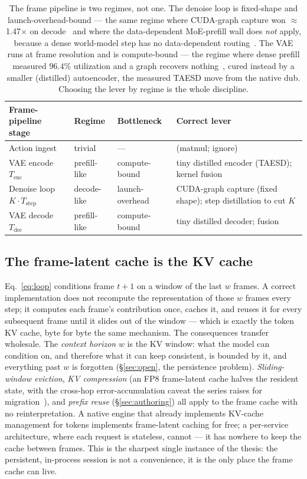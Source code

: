 \documentclass[11pt]{article}
\newcommand{\Tstep}{\ensuremath{T_{\mathrm{step}}}}
\newcommand{\Tenc}{\ensuremath{T_{\mathrm{enc}}}}
\newcommand{\Tdec}{\ensuremath{T_{\mathrm{dec}}}}
\begin{document}
\begin{table}[t]
\centering
\small
\setlength{\tabcolsep}{6pt}
\begin{tabular}{@{}p{3.5cm}p{2.4cm}p{2.4cm}p{4.6cm}@{}}
\toprule
\textbf{Frame-pipeline stage} & \textbf{Regime} & \textbf{Bottleneck} & \textbf{Correct lever} \\
\midrule
Action ingest & trivial & --- & (matmul; ignore) \\
VAE encode $\Tenc$ & prefill-like & compute-bound & tiny distilled encoder (TAESD); kernel fusion \\
Denoise loop $K{\cdot}\Tstep$ & decode-like & launch-overhead & CUDA-graph capture (fixed shape); step distillation to cut $K$ \\
VAE decode $\Tdec$ & prefill-like & compute-bound & tiny distilled decoder; fusion \\
\bottomrule
\end{tabular}
\caption{The frame pipeline is two regimes, not one. The denoise loop is fixed-shape and launch-overhead-bound
--- the same regime where CUDA-graph capture won $\approx$1.47$\times$ on decode~\cite{backend} and where the
data-dependent MoE-prefill wall does \emph{not} apply, because a dense world-model step has no data-dependent
routing~\cite{openproblems}. The VAE runs at frame resolution and is compute-bound --- the regime where dense
prefill measured $96.4\%$ utilization and a graph recovers nothing~\cite{openproblems}, cured instead by a
smaller (distilled) autoencoder, the measured TAESD move from the native dub. Choosing the lever by regime is
the whole discipline.}
\label{tab:regimes}
\end{table}

\subsection{The frame-latent cache is the KV cache}
\label{sec:kv}

Eq.~\eqref{eq:loop} conditions frame $t{+}1$ on a window of the last $w$ frames. A correct implementation does
not recompute the representation of those $w$ frames every step; it computes each frame's contribution once,
caches it, and reuses it for every subsequent frame until it slides out of the window --- which is exactly the
token KV cache, byte for byte the same mechanism. The consequences transfer wholesale. The
\emph{context horizon} $w$ is the KV window: what the model can condition on, and therefore what it can keep
consistent, is bounded by it, and everything past $w$ is forgotten (\S\ref{sec:open}, the persistence
problem). \emph{Sliding-window eviction}, \emph{KV compression} (an FP8 frame-latent cache halves the resident
state, with the cross-hop error-accumulation caveat the series raises for migration~\cite{openproblems}), and
\emph{prefix reuse} (\S\ref{sec:authoring}) all apply to the frame cache with no reinterpretation. A native
engine that already implements KV-cache management for tokens implements frame-latent caching for free; a
per-service architecture, where each request is stateless, cannot --- it has nowhere to keep the cache between
frames. This is the sharpest single instance of the thesis: the persistent, in-process session is not a
convenience, it is the only place the frame cache can live.
\end{document}
